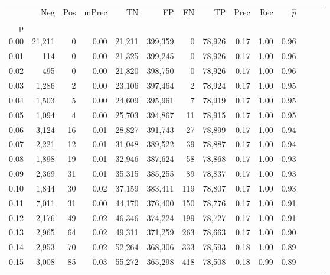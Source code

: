 \begin{tabular}{rrrrrrrrrrrrrr}
\toprule
{} &     Neg &    Pos & mPrec &       TN &       FP &      FN &      TP &  Prec &   Rec & $\hat{p}$ \\
p    &         &        &       &          &          &         &         &       &       &           \\
\midrule
0.00 &  21,211 &      0 &  0.00 &   21,211 &  399,359 &       0 &  78,926 &  0.17 &  1.00 &      0.96 \\
0.01 &     114 &      0 &  0.00 &   21,325 &  399,245 &       0 &  78,926 &  0.17 &  1.00 &      0.96 \\
0.02 &     495 &      0 &  0.00 &   21,820 &  398,750 &       0 &  78,926 &  0.17 &  1.00 &      0.96 \\
0.03 &   1,286 &      2 &  0.00 &   23,106 &  397,464 &       2 &  78,924 &  0.17 &  1.00 &      0.95 \\
0.04 &   1,503 &      5 &  0.00 &   24,609 &  395,961 &       7 &  78,919 &  0.17 &  1.00 &      0.95 \\
0.05 &   1,094 &      4 &  0.00 &   25,703 &  394,867 &      11 &  78,915 &  0.17 &  1.00 &      0.95 \\
0.06 &   3,124 &     16 &  0.01 &   28,827 &  391,743 &      27 &  78,899 &  0.17 &  1.00 &      0.94 \\
0.07 &   2,221 &     12 &  0.01 &   31,048 &  389,522 &      39 &  78,887 &  0.17 &  1.00 &      0.94 \\
0.08 &   1,898 &     19 &  0.01 &   32,946 &  387,624 &      58 &  78,868 &  0.17 &  1.00 &      0.93 \\
0.09 &   2,369 &     31 &  0.01 &   35,315 &  385,255 &      89 &  78,837 &  0.17 &  1.00 &      0.93 \\
0.10 &   1,844 &     30 &  0.02 &   37,159 &  383,411 &     119 &  78,807 &  0.17 &  1.00 &      0.93 \\
0.11 &   7,011 &     31 &  0.00 &   44,170 &  376,400 &     150 &  78,776 &  0.17 &  1.00 &      0.91 \\
0.12 &   2,176 &     49 &  0.02 &   46,346 &  374,224 &     199 &  78,727 &  0.17 &  1.00 &      0.91 \\
0.13 &   2,965 &     64 &  0.02 &   49,311 &  371,259 &     263 &  78,663 &  0.17 &  1.00 &      0.90 \\
0.14 &   2,953 &     70 &  0.02 &   52,264 &  368,306 &     333 &  78,593 &  0.18 &  1.00 &      0.89 \\
0.15 &   3,008 &     85 &  0.03 &   55,272 &  365,298 &     418 &  78,508 &  0.18 &  0.99 &      0.89 \\

\end{tabular}
